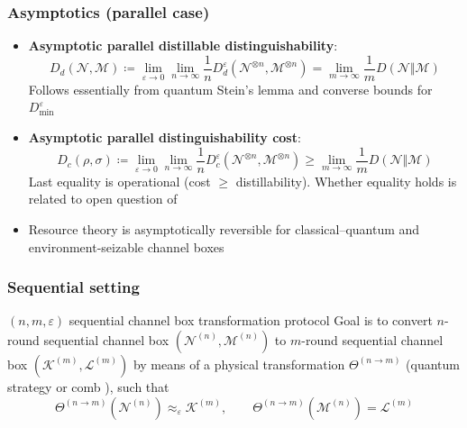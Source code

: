 \documentclass[usenames,dvipsnames,handout]{beamer}
\begin{document}
\begin{frame}
\frametitle{Asymptotics (parallel case)}

\begin{itemize}

\pause
\item {\color{MidnightBlue}\textbf{Asymptotic parallel distillable distinguishability}}:
$$
D_{d}(\mathcal{N},\mathcal{M})  \coloneqq  \lim_{\varepsilon \to 0} \lim_{n \to \infty}\frac{1}{n}D_{d}^{\varepsilon}(\mathcal{N}^{\otimes n},\mathcal{M}^{\otimes n}) 
  = \lim_{m \to \infty} \frac{1}{m}D(\mathcal{N} \Vert \mathcal{M})
$$
Follows essentially from quantum Stein's lemma \cite{HP91} and converse bounds for $D_{\min}^{\varepsilon}$ \cite{WR12,MW12,KW17}

\pause
\item {\color{MidnightBlue}\textbf{Asymptotic parallel distinguishability cost}}:
$$
D_{c}(\rho,\sigma)  \coloneqq  \lim_{\varepsilon \to 0} \lim_{n \to \infty}\frac{1}{n}D_{c}^{\varepsilon}(\mathcal{N}^{\otimes n},\mathcal{M}^{\otimes n}) 
 \geq \lim_{m \to \infty} \frac{1}{m}D(\mathcal{N} \Vert \mathcal{M})
$$
Last equality is operational (cost $\geq$ distillability). Whether equality holds is related to open question of \cite{LW19}

\pause
\item Resource theory is asymptotically reversible for classical--quantum and environment-seizable channel boxes

\end{itemize}

\end{frame}


\begin{frame}
\frametitle{Sequential setting}


\pause
\begin{block}{$(n,m,\varepsilon)$ sequential channel box transformation protocol}
Goal is to convert $n$-round sequential channel box $(\mathcal{N}^{(n)},\mathcal{M}^{(n)})$ to $m$-round sequential channel box 
$(\mathcal{K}^{(m)},\mathcal{L}^{(m)})$ by means of a physical transformation $\Theta^{(n\to m)}$ (quantum strategy \cite{GW07} or comb \cite{CDP09}), such that 
$$\Theta^{(n\to m)}(\mathcal{N}^{(n)}) \approx_{\varepsilon} \mathcal{K}^{(m)}, \qquad \Theta^{(n\to m)} (\mathcal{M}^{(n)})= \mathcal{L}^{(m)}$$
\end{block}



\end{frame}
\end{document}
